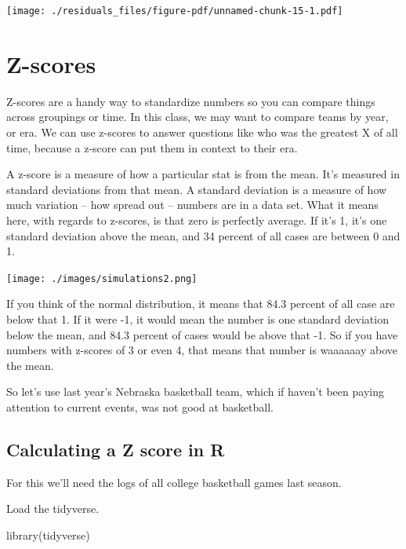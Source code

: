 \documentclass[
  letterpaper,
  DIV=11,
  numbers=noendperiod]{scrreprt}
\newenvironment{Shaded}{\begin{snugshade}}{\end{snugshade}}
\newcommand{\FunctionTok}[1]{\textcolor[rgb]{0.28,0.35,0.67}{#1}}
\newcommand{\NormalTok}[1]{\textcolor[rgb]{0.00,0.23,0.31}{#1}}
\begin{document}
\texttt{[image: ./residuals\_files/figure-pdf/unnamed-chunk-15-1.pdf]}


\hypertarget{z-scores}{%
\chapter{Z-scores}\label{z-scores}}

Z-scores are a handy way to standardize numbers so you can compare
things across groupings or time. In this class, we may want to compare
teams by year, or era. We can use z-scores to answer questions like who
was the greatest X of all time, because a z-score can put them in
context to their era.

A z-score is a measure of how a particular stat is from the mean. It's
measured in standard deviations from that mean. A standard deviation is
a measure of how much variation -- how spread out -- numbers are in a
data set. What it means here, with regards to z-scores, is that zero is
perfectly average. If it's 1, it's one standard deviation above the
mean, and 34 percent of all cases are between 0 and 1.

\texttt{[image: ./images/simulations2.png]}

If you think of the normal distribution, it means that 84.3 percent of
all case are below that 1. If it were -1, it would mean the number is
one standard deviation below the mean, and 84.3 percent of cases would
be above that -1. So if you have numbers with z-scores of 3 or even 4,
that means that number is waaaaaay above the mean.

So let's use last year's Nebraska basketball team, which if haven't been
paying attention to current events, was not good at basketball.

\hypertarget{calculating-a-z-score-in-r}{%
\section{Calculating a Z score in R}\label{calculating-a-z-score-in-r}}

For this we'll need the logs of all college basketball games last
season.

Load the tidyverse.

\begin{Shaded}
\begin{Highlighting}[]
\FunctionTok{library}\NormalTok{(tidyverse)}
\end{Highlighting}
\end{Shaded}
\end{document}
